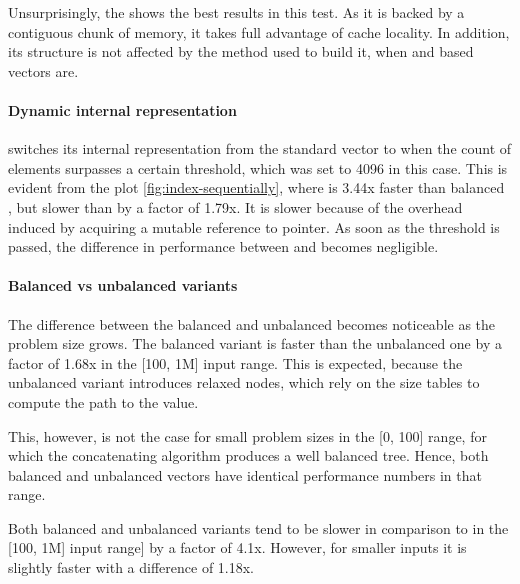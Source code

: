 
Unsurprisingly, the \stdvec{} shows the best results in this test. As it is backed by a contiguous chunk of memory, it takes full advantage of cache locality. In addition, its structure is not affected by the method used to build it, when \rbtree{} and \rrbtree{} based vectors are. 

\paragraph{Dynamic internal representation}

\pvec{} switches its internal representation from the standard vector to \rrbvec{} when the count of elements surpasses a certain threshold, which was set to 4096 in this case. This is evident from the plot \ref{fig:index-sequentially}, where \pvec{} is 3.44x faster than balanced \rrbvec{}, but slower than \stdvec{} by a factor of 1.79x. It is slower because of the overhead induced by acquiring a mutable reference to \rc{} pointer. As soon as the threshold is passed, the difference in performance between \pvec{} and \rrbvec{} becomes negligible. 


\paragraph{Balanced vs unbalanced variants}
The difference between the balanced and unbalanced \rrbvec{} becomes noticeable as the problem size grows. The balanced variant is faster than the unbalanced one by a factor of 1.68x in the [100, 1M] input range. This is expected, because the unbalanced variant introduces relaxed nodes, which rely on the size tables to compute the path to the value. 

This, however, is not the case for small problem sizes in the [0, 100] range, for which the concatenating algorithm produces a well balanced tree. Hence, both balanced and unbalanced vectors have identical performance numbers in that range. 

Both balanced and unbalanced \imrsvec{} variants tend to be slower in comparison to \rrbvec{} in the [100, 1M] input range] by a factor of 4.1x. However, for smaller inputs it is slightly faster with a difference of 1.18x. 


